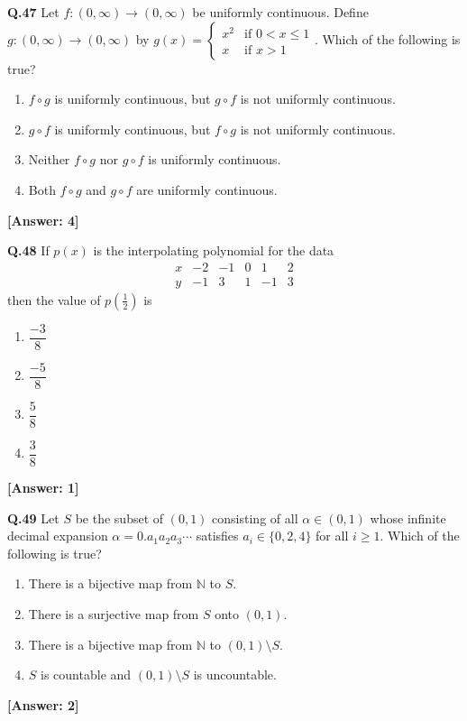 \documentclass[12pt,a4paper]{article}
\newcommand{\ans}[1]{\quad\textcolor{anscolor}{\textbf{[Answer: #1]}}}
\begin{document}
\textbf{Q.47} Let $f:(0,\infty)\to(0,\infty)$ be uniformly continuous. Define $g:(0,\infty)\to(0,\infty)$ by $g(x)=\begin{cases}x^2&\text{if }0<x\le1\\x&\text{if }x>1\end{cases}$. Which of the following is true?
\begin{enumerate}[label=\arabic*.]
\item $f\circ g$ is uniformly continuous, but $g\circ f$ is not uniformly continuous.
\item $g\circ f$ is uniformly continuous, but $f\circ g$ is not uniformly continuous.
\item Neither $f\circ g$ nor $g\circ f$ is uniformly continuous.
\item Both $f\circ g$ and $g\circ f$ are uniformly continuous.
\end{enumerate}\ans{4}

\textbf{Q.48} If $p(x)$ is the interpolating polynomial for the data
\[\begin{array}{c|ccccc}x&-2&-1&0&1&2\\\hline y&-1&3&1&-1&3\end{array}\]
then the value of $p\!\left(\tfrac{1}{2}\right)$ is
\begin{enumerate}[label=\arabic*.]
\item $\dfrac{-3}{8}$ \item $\dfrac{-5}{8}$ \item $\dfrac{5}{8}$ \item $\dfrac{3}{8}$
\end{enumerate}\ans{1}

\textbf{Q.49} Let $S$ be the subset of $(0,1)$ consisting of all $\alpha\in(0,1)$ whose infinite decimal expansion $\alpha=0.a_1a_2a_3\cdots$ satisfies $a_i\in\{0,2,4\}$ for all $i\ge1$. Which of the following is true?
\begin{enumerate}[label=\arabic*.]
\item There is a bijective map from $\mathbb{N}$ to $S$.
\item There is a surjective map from $S$ onto $(0,1)$.
\item There is a bijective map from $\mathbb{N}$ to $(0,1)\setminus S$.
\item $S$ is countable and $(0,1)\setminus S$ is uncountable.
\end{enumerate}\ans{2}
\end{document}
